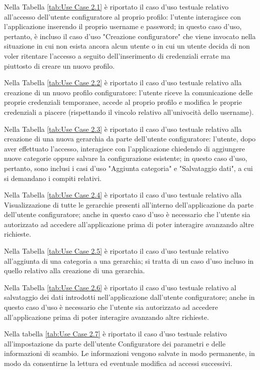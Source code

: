 Nella Tabella \ref{tab:Use Case 2.1} è riportato il caso d'uso testuale relativo all'accesso dell'utente configuratore al proprio profilo: l'utente interagisce con l'applicazione inserendo il proprio username e password; in questo caso d'uso, pertanto, è incluso il caso d'uso "Creazione configuratore" che viene invocato nella situazione in cui non esista ancora alcun utente o in cui un utente decida di non voler ritentare l'accesso a seguito dell'inserimento di credenziali errate ma piuttosto di creare un nuovo profilo.\bigskip

Nella Tabella \ref{tab:Use Case 2.2} è riportato il caso d'uso testuale relativo alla creazione di un nuovo profilo configuratore: l'utente riceve la comunicazione delle proprie credenziali temporanee, accede al proprio profilo e modifica le proprie credenziali a piacere (rispettando il vincolo relativo all'univocità dello username).\bigskip

Nella Tabella \ref{tab:Use Case 2.3} è riportato il caso d'uso testuale relativo alla creazione di una nuova gerarchia da parte dell'utente configuratore: l'utente, dopo aver effettuato l'accesso, interagisce con l'applicazione chiedendo di aggiungere nuove categorie oppure salvare la configurazione esistente; in questo caso d'uso, pertanto, sono inclusi i casi d'uso "Aggiunta categoria" e "Salvataggio dati", a cui si demandano i compiti relativi.\bigskip

Nella Tabella \ref{tab:Use Case 2.4} è riportato il caso d'uso testuale relativo alla Visualizzazione di tutte le gerarchie presenti all'interno dell'applicazione da parte dell'utente configuratore; anche in questo caso d'uso è necessario che l'utente sia autorizzato ad accedere all'applicazione prima di poter interagire avanzando altre richieste.\bigskip

Nella Tabella \ref{tab:Use Case 2.5} è riportato il caso d'uso testuale relativo all'aggiunta di una categoria a una gerarchia; si tratta di un caso d'uso incluso in quello relativo alla creazione di una gerarchia.\bigskip

Nella Tabella \ref{tab:Use Case 2.6} è riportato il caso d'uso testuale relativo al salvataggio dei dati introdotti nell'applicazione dall'utente configuratore; anche in questo caso d'uso è necessario che l'utente sia autorizzato ad accedere all'applicazione prima di poter interagire avanzando altre richieste.\bigskip

Nella tabella \ref{tab:Use Case 2.7} è riportato il caso d'uso testuale relativo all'impostazione da parte dell'utente Configuratore dei parametri e delle informazioni di scambio.
Le informazioni vengono salvate in modo permanente, in modo da consentirne la lettura ed eventuale modifica ad accessi successivi.\bigskip

